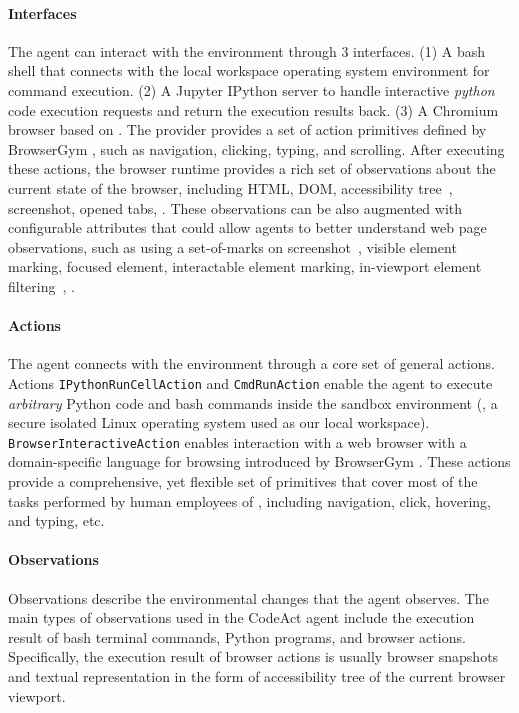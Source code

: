 \paragraph{Interfaces}
The agent can interact with the environment through 3 interfaces. 
(1) A bash shell that connects with the local workspace operating system environment for command execution.
(2) A Jupyter IPython server to handle interactive \emph{python} \citep{ipython} code execution requests and return the execution results back.
(3) A Chromium browser based on \cite{playwright}. The provider provides a set of action primitives defined by BrowserGym \citep{browsergym, workarena2024}, such as navigation, clicking, typing, and scrolling. 
After executing these actions, the browser runtime provides a rich set of observations about the current state of the browser, including HTML, DOM, accessibility tree~\citep{accessibilitytree}, screenshot, opened tabs, \etc.
These observations can be also augmented with configurable attributes that could allow agents to better understand web page observations, such as using a set-of-marks on screenshot~\citep{yang2023setofmark,he2024webvoyager}, visible element marking, focused element, interactable element marking, in-viewport element filtering~\citep{zhou2023webarena}, \etc.

\paragraph{Actions}
The agent connects with the environment through a core set of general actions.
Actions \texttt{IPythonRunCellAction} and \texttt{CmdRunAction} enable the agent to execute \textit{arbitrary} Python code and bash commands inside the sandbox environment (\eg, a secure isolated Linux operating system used as our local workspace).
% 
\texttt{BrowserInteractiveAction} enables interaction with a web browser with a domain-specific language for browsing introduced by BrowserGym \citep{chezelles2024browsergym,workarena2024}.
% 
These actions provide a comprehensive, yet flexible set of primitives that cover most of the tasks performed by human employees of \tac, including navigation, click, hovering, and typing, etc.

\paragraph{Observations}
Observations describe the environmental changes that the agent observes. The main types of observations used in the CodeAct agent include the execution result of bash terminal commands, Python programs, and browser actions. 
Specifically, the execution result of browser actions is usually browser snapshots and textual representation in the form of accessibility tree of the current browser viewport.

